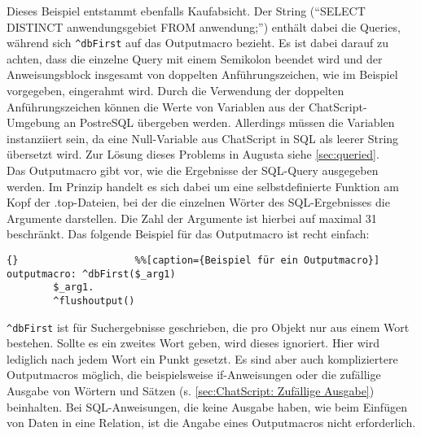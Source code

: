 Dieses Beispiel entstammt ebenfalls Kaufabsicht. Der String ("`SELECT DISTINCT anwendungsgebiet FROM anwendung;"') enthält dabei die Queries, während sich \lstinline|^dbFirst| auf das Outputmacro bezieht. Es ist dabei darauf zu achten, dass die einzelne Query mit einem Semikolon beendet wird und der Anweisungsblock insgesamt von doppelten Anführungszeichen, wie im Beispiel vorgegeben, eingerahmt wird. Durch die Verwendung der doppelten Anführungszeichen können die Werte von Variablen aus der ChatScript-Umgebung an PostreSQL übergeben werden. Allerdings müssen die Variablen instanziiert sein, da eine Null-Variable aus ChatScript in SQL als leerer String übersetzt wird. Zur Lösung dieses Problems in Augusta siehe \ref{sec:queried}.\\
Das Outputmacro gibt vor, wie die Ergebnisse der SQL-Query ausgegeben werden. Im Prinzip handelt es sich dabei um eine selbstdefinierte Funktion am Kopf der .top-Dateien, bei der die einzelnen Wörter des SQL-Ergebnisses die Argumente darstellen. Die Zahl der Argumente ist hierbei auf maximal 31 beschränkt. Das folgende Beispiel für das Outputmacro ist recht einfach:

\begin{lstlisting}{}					%%[caption={Beispiel für ein Outputmacro}]
outputmacro: ^dbFirst($_arg1)
	    $_arg1.
	    ^flushoutput()
\end{lstlisting}

\lstinline|^dbFirst| ist für Suchergebnisse geschrieben, die pro Objekt nur aus einem Wort bestehen. Sollte es ein zweites Wort geben, wird dieses ignoriert. Hier wird lediglich nach jedem Wort ein Punkt gesetzt. Es sind aber auch kompliziertere Outputmacros möglich, die beispielsweise if-Anweisungen oder die zufällige Ausgabe von Wörtern und Sätzen (s. \ref{sec:ChatScript: Zufällige Ausgabe}) beinhalten. Bei SQL-Anweisungen, die keine Ausgabe haben, wie beim Einfügen von Daten in eine Relation, ist die Angabe eines Outputmacros nicht erforderlich.\\


